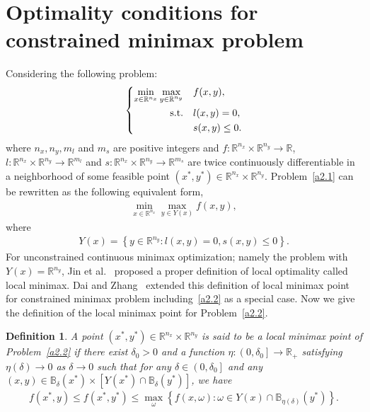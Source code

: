 \documentclass{article}
\newtheorem{definition}{Definition}
\begin{document}
	\section{Optimality conditions for constrained minimax problem}\label{section2}
	Considering the following problem:
	\begin{align}\label{a2.1}
		\left\lbrace\begin{aligned}
			\min_{x\in\mathbb{R}^{n_{x}}}\max_{y\in\mathbb{R}^{n_{y}}}\quad& f(x,y),\\
			{\rm s.t.}\quad& l(x, y) = 0,\\
			& s(x, y) \leq 0.
		\end{aligned}\right.
	\end{align}
	where $n_{x}, n_{y}, m_{l}$ and $m_{s}$ are positive integers and $f : \mathbb{R}^{n_{x}} \times \mathbb{R}^{n_{y}} \rightarrow \mathbb{R}$, $l : \mathbb{R}^{n_{x}} \times \mathbb{R}^{n_{y}} \rightarrow \mathbb{R}^{m_{l}}$ and $s : \mathbb{R}^{n_{x}} \times \mathbb{R}^{n_{y}} \rightarrow \mathbb{R}^{m_{s}}$ are twice continuously differentiable in a neighborhood of some feasible point $(x^{\ast}, y^{\ast}) \in \mathbb{R}^{n_{x}} \times \mathbb{R}^{n_{y}}$. Problem~\eqref{a2.1} can be rewritten as the following equivalent form,
	\begin{align}\label{a2.2}
		\min_{x\in\mathbb{R}^{n_{x}}}\max_{y \in Y(x)} f(x,y),
	\end{align}
	where
	\begin{align}\label{definition of Y(x)}
		Y(x) = \left\lbrace y \in\mathbb{R}^{n_{y}} : l(x, y) = 0, s(x, y) \leq 0\right\rbrace.
	\end{align}
	For unconstrained continuous minimax optimization; namely the problem with $Y(x) = \mathbb{R}^{n_{y}}$, Jin et al.~\cite{jinWhatLocalOptimality2020} proposed a proper definition of local optimality called local minimax. Dai and Zhang~\cite{daiOptimalityConditionsConstrained2020} extended this definition of local minimax point for constrained minimax problem including~\eqref{a2.2} as a special case. Now we give the definition of the local minimax point for Problem~\eqref{a2.2}.
	\begin{definition}\label{minimax point}
		A point $(x^{\ast}, y^{\ast}) \in \mathbb{R}^{n_{x}} \times \mathbb{R}^{n_{y}}$ is said to be a local minimax point of Problem~\eqref{a2.2} if there exist $\delta_{0} > 0$ and a function $\eta : \left( 0, \delta_{0}\right] \rightarrow \mathbb{R}_{+}$ satisfying $\eta(\delta) \rightarrow 0$ as $\delta \rightarrow 0$ such that for any $\delta \in \left( 0, \delta_{0}\right]$ and any $(x, y) \in \mathbb{B}_{\delta}(x^{\ast}) \times\left[Y(x^{\ast}) \cap\mathbb{B}_{\delta}(y^{\ast})\right]$, we have
		\begin{align}
			f(x^{\ast}, y) \leq f(x^{\ast}, y^{\ast}) \leq \max_{\omega}\left\lbrace f(x, \omega) : \omega \in Y(x)\cap\mathbb{B}_{\eta(\delta)}(y^{\ast})\right\rbrace.
		\end{align}
	\end{definition}
\end{document}
